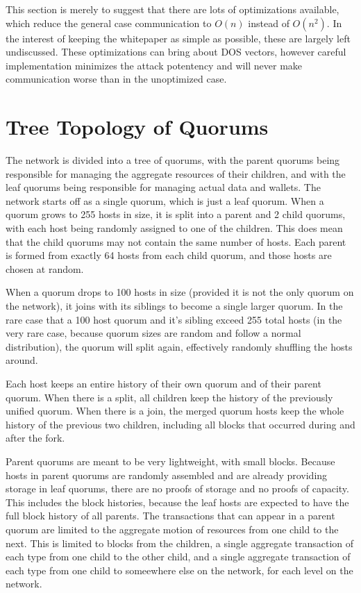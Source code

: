 \documentclass[twocolumn]{article}
\begin{document}
This section is merely to suggest that there are lots of optimizations available, which reduce the general case communication to $O(n)$ instead of $O(n^2)$.
In the interest of keeping the whitepaper as simple as possible, these are largely left undiscussed.
These optimizations can bring about DOS vectors, however careful implementation minimizes the attack potentency and will never make communication worse than in the unoptimized case.

\section{Tree Topology of Quorums}
The network is divided into a tree of quorums, with the parent quorums being responsible for managing the aggregate resources of their children, and with the leaf quorums being responsible for managing actual data and wallets.
The network starts off as a single quorum, which is just a leaf quorum.
When a quorum grows to 255 hosts in size, it is split into a parent and 2 child quorums, with each host being randomly assigned to one of the children.
This does mean that the child quorums may not contain the same number of hosts.
Each parent is formed from exactly 64 hosts from each child quorum, and those hosts are chosen at random.

When a quorum drops to 100 hosts in size (provided it is not the only quorum on the network), it joins with its siblings to become a single larger quorum.
In the rare case that a 100 host quorum and it's sibling exceed 255 total hosts (in the very rare case, because quorum sizes are random and follow a normal distribution), the quorum will split again, effectively randomly shuffling the hosts around.

Each host keeps an entire history of their own quorum and of their parent quorum.
When there is a split, all children keep the history of the previously unified quorum.
When there is a join, the merged quorum hosts keep the whole history of the previous two children, including all blocks that occurred during and after the fork.


Parent quorums are meant to be very lightweight, with small blocks.
Because hosts in parent quorums are randomly assembled and are already providing storage in leaf quorums, there are no proofs of storage and no proofs of capacity.
This includes the block histories, because the leaf hosts are expected to have the full block history of all parents.
The transactions that can appear in a parent quorum are limited to the aggregate motion of resources from one child to the next.
This is limited to blocks from the children, a single aggregate transaction of each type from one child to the other child, and a single aggregate transaction of each type from one child to someewhere else on the network, for each level on the network.
\end{document}
